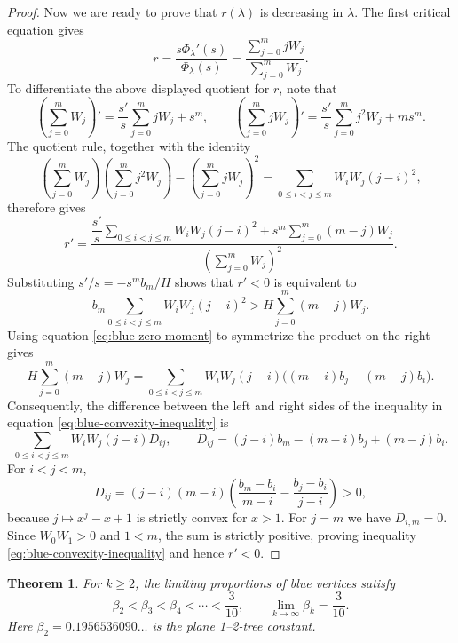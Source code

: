 \documentclass[11pt, onesided]{amsart}
\newtheorem{theorem}{Theorem}[section]
\theoremstyle{remark}
\begin{document}
\begin{proof}
Now we are ready to prove that $r(\lambda)$ is decreasing in $\lambda$.
The first critical equation gives
\[
r=\frac{s\Phi_\lambda'(s)}{\Phi_\lambda(s)}
=\frac{\sum_{j=0}^m jW_j}{\sum_{j=0}^m W_j}.
\]
To differentiate the above displayed quotient for $r$, note that
\[
\left(\sum_{j=0}^m W_j\right)'
=\frac{s'}s\sum_{j=0}^m jW_j+s^m,
\qquad
\left(\sum_{j=0}^m jW_j\right)'
=\frac{s'}s\sum_{j=0}^m j^2W_j+ms^m.
\]
The quotient rule, together with the identity
\[
\left(\sum_{j=0}^m W_j\right)
\left(\sum_{j=0}^m j^2W_j\right)
-\left(\sum_{j=0}^m jW_j\right)^2
=\sum_{0\leq i<j\leq m}W_iW_j(j-i)^2,
\]
therefore gives
\[
r'=\frac{
\dfrac{s'}s\displaystyle\sum_{0\leq i<j\leq m}W_iW_j(j-i)^2
+s^m\displaystyle\sum_{j=0}^m(m-j)W_j
}{\left(\displaystyle\sum_{j=0}^m W_j\right)^2}.
\]
Substituting $s'/s=-s^m b_m/H$ shows that $r'<0$ is equivalent to
\begin{equation}\label{eq:blue-convexity-inequality}
b_m\sum_{0\leq i<j\leq m}W_iW_j(j-i)^2
>H\sum_{j=0}^m(m-j)W_j.
\end{equation}
Using equation \eqref{eq:blue-zero-moment} to symmetrize the product
on the right gives
\[
H\sum_{j=0}^m(m-j)W_j
=\sum_{0\leq i<j\leq m}W_iW_j(j-i)
\bigl((m-i)b_j-(m-j)b_i\bigr).
\]
Consequently, the difference between the left and right sides of the inequality in equation
\eqref{eq:blue-convexity-inequality} is
\[
\sum_{0\leq i<j\leq m}W_iW_j(j-i)D_{ij},
\qquad
D_{ij}=(j-i)b_m-(m-i)b_j+(m-j)b_i.
\]
For $i<j<m$,
\[
D_{ij}=(j-i)(m-i)
\left(\frac{b_m-b_i}{m-i}-\frac{b_j-b_i}{j-i}\right)>0,
\]
because $j\mapsto x^j-x+1$ is strictly convex for $x>1$.
For $j=m$ we have $D_{i,m}=0$. Since $W_0W_1>0$ and $1<m$,
the sum is strictly positive, proving inequality
\eqref{eq:blue-convexity-inequality} and hence $r'<0$.
\end{proof}

\begin{theorem}\label{blue-monotone}
For $k\geq2$, the limiting proportions of blue vertices satisfy
\[
\beta_2<\beta_3<\beta_4<\cdots<\frac3{10},
\qquad \lim_{k\to\infty}\beta_k=\frac3{10}.
\]
Here $\beta_2=0.1956536090\ldots$ is the plane 1--2-tree constant.
\end{theorem}
\end{document}
